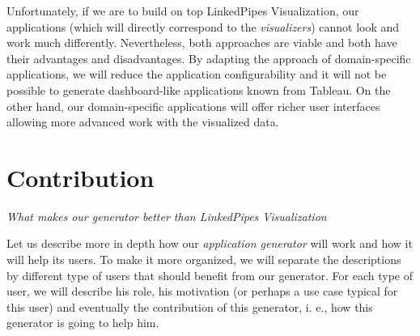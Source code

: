 Unfortunately, if we are to build on top LinkedPipes Visualization, our applications (which will directly correspond to the \emph{visualizers}) cannot look and work much differently. Nevertheless, both approaches are viable and both have their advantages and disadvantages. By adapting the approach of domain-specific applications, we will reduce the application configurability and it will not be possible to generate dashboard-like applications known from Tableau. On the other hand, our domain-specific applications will offer richer user interfaces allowing more advanced work with the visualized data.

\section{Contribution}

\textit{What makes our generator better than LinkedPipes Visualization}

Let us describe more in depth how our \emph{application generator} will work and how it will help its users. To make it more organized, we will separate the descriptions by different type of users that should benefit from our generator. For each type of user, we will describe his role, his motivation (or perhaps a use case typical for this user) and eventually the contribution of this generator, i. e., how this generator is going to help him.


